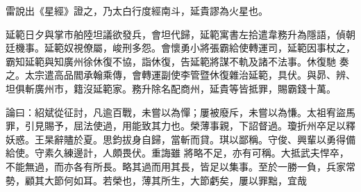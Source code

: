 \begin{pinyinscope}
 雷說出《星經》證之，乃太白行度經南斗，延貴謬為火星也。



 延範日夕與掌市舶陸坦議欲發兵，會坦代歸，延範寓書左拾遣韋務升為隱語，偵朝廷機事。延範奴視僚屬，峻刑多怨。會懷勇小將張霸給使轉運司，延範因事杖之，霸知延範與知廣州徐休復不協，詣休復，告延範將謀不軌及諸不法事。休復馳
 奏之。太宗遣高品閻承翰乘傳，會轉運副使李管暨休復雜治延範，具伏。與昴、辨、坦俱斬廣州市，籍沒延範家。務升除名配商州，延貴等皆抵罪，賜霸錢十萬。



 論曰：紹斌從征討，凡逾百戰，未嘗以為憚；屢被廢斥，未嘗以為慊。太祖宥盜馬罪，引見賜予，屈法使過，用能致其力也。榮薄事親，下詔督過。瓊折州卒足以釋妖惑。王杲辭贐於夏。思鈞拔身自歸，當斬而貸。琪以鄙稱。守俊、興輩以勇得備給使。守素久練邊計，人頗畏伏。重誨雖
 將略不足，亦有可稱。大抵武夫悍卒，不能無過，而亦各有所長。略其過而用其長，皆足以集事。至於一勝一負，兵家常勢，顧其大節何如耳。若榮也，薄其所生，大節虧矣，屢以罪黜，宜哉



\end{pinyinscope}